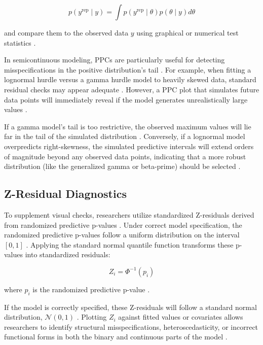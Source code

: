 \documentclass[11pt, a4paper]{article}
\begin{document}
\begin{equation}
p(y^{\text{rep}} \mid y) = \int p(y^{\text{rep}} \mid \theta) p(\theta \mid y) d\theta
\end{equation}

and compare them to the observed data $y$ using graphical or numerical test statistics \cite{ref22, ref47}.

In semicontinuous modeling, PPCs are particularly useful for detecting misspecifications in the positive distribution’s tail \cite{ref22}. For example, when fitting a lognormal hurdle versus a gamma hurdle model to heavily skewed data, standard residual checks may appear adequate \cite{ref22, ref48}. However, a PPC plot that simulates future data points will immediately reveal if the model generates unrealistically large values \cite{ref22}.

If a gamma model’s tail is too restrictive, the observed maximum values will lie far in the tail of the simulated distribution \cite{ref22}. Conversely, if a lognormal model overpredicts right-skewness, the simulated predictive intervals will extend orders of magnitude beyond any observed data points, indicating that a more robust distribution (like the generalized gamma or beta-prime) should be selected \cite{ref3, ref7, ref22}.

\subsection{Z-Residual Diagnostics}
To supplement visual checks, researchers utilize standardized Z-residuals derived from randomized predictive p-values \cite{ref49}. Under correct model specification, the randomized predictive p-values follow a uniform distribution on the interval $[0, 1]$ \cite{ref49}. Applying the standard normal quantile function transforms these p-values into standardized residuals:

\begin{equation}
Z_i = \Phi^{-1}(p_i)
\end{equation}

where $p_i$ is the randomized predictive p-value \cite{ref49}.

If the model is correctly specified, these Z-residuals will follow a standard normal distribution, $\mathcal{N}(0, 1)$ \cite{ref49}. Plotting $Z_i$ against fitted values or covariates allows researchers to identify structural misspecifications, heteroscedasticity, or incorrect functional forms in both the binary and continuous parts of the model \cite{ref49}.
\end{document}
